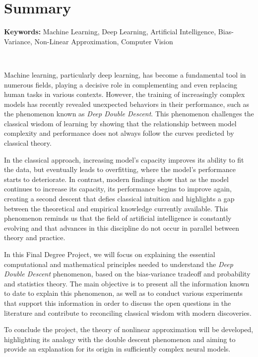 %

\chapter{Summary}

\noindent\textbf{Keywords:} Machine Learning, Deep Learning, Artificial Intelligence, Bias-Variance, Non-Linear Approximation, Computer Vision

\

Machine learning, particularly deep learning, has become a fundamental tool in numerous fields, playing a decisive role in complementing and even replacing human tasks in various contexts. However, the training of increasingly complex models has recently revealed unexpected behaviors in their performance, such as the phenomenon known as \emph{Deep Double Descent}. This phenomenon challenges the classical wisdom of learning by showing that the relationship between model complexity and performance does not always follow the curves predicted by classical theory.\newline

In the classical approach, increasing model's capacity improves its ability to fit the data, but eventually leads to overfitting, where the model's performance starts to deteriorate. In contrast, modern findings show that as the model continues to increase its capacity, its performance begins to improve again, creating a second descent that defies classical intuition and highlights a gap between the theoretical and empirical knowledge currently available. This phenomenon reminds us that the field of artificial intelligence is constantly evolving and that advances in this discipline do not occur in parallel between theory and practice.\newline

In this Final Degree Project, we will focus on explaining the essential computational and mathematical principles needed to understand the \emph{Deep Double Descent} phenomenon, based on the bias-variance tradeoff and probability and statistics theory. The main objective is to present all the information known to date to explain this phenomenon, as well as to conduct various experiments that support this information in order to discuss the open questions in the literature and contribute to reconciling classical wisdom with modern discoveries.\newline

To conclude the project, the theory of nonlinear approximation will be developed, highlighting its analogy with the double descent phenomenon and aiming to provide an explanation for its origin in sufficiently complex neural models.\newline

\clearpage
\thispagestyle{empty}
\mbox{}
\newpage
\endinput
